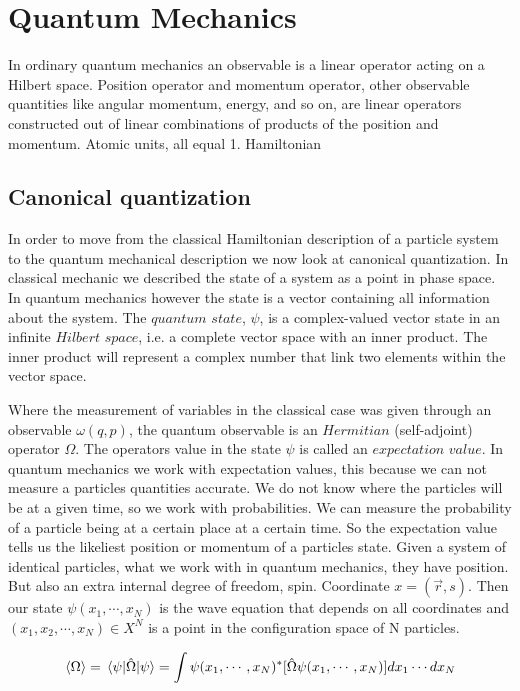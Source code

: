 \section{Quantum Mechanics}

In ordinary quantum mechanics an observable is a linear operator acting on a Hilbert space. Position operator and momentum operator, other observable quantities like angular momentum, energy, and so on, are linear operators constructed out of linear combinations of products of the position and momentum.\cite{kvaal}
Atomic units, all equal 1.
Hamiltonian 

\subsection{Canonical quantization}

In order to move from the classical Hamiltonian description of a particle system to the quantum mechanical description we now look at canonical quantization. 
In classical mechanic we described the state of a system as a point in phase space. In quantum mechanics however the state is a vector containing all information about the system. The $\textit{quantum state}$, $\psi$, is a complex-valued vector state in an infinite $\textit{Hilbert space}$, i.e. a complete vector space with an inner product. The inner product will represent a complex number that link two elements within the vector space. 

Where the measurement of variables in the classical case was given through an observable $\omega(q, p)$, the quantum observable is an $\textit{Hermitian}$ (self-adjoint) operator $\Omega$. The operators value in the state $\psi$ is called an $\textit{expectation value}$.
In quantum mechanics we work with expectation values, this because we can not measure a particles quantities accurate. We do not know where the particles will be at a given time, so we work with probabilities. We can measure the probability of a particle being at a certain place at a certain time. So the expectation value tells us the likeliest position or momentum of a particles state. 
Given a system of identical particles, what we work with in quantum mechanics, they have position. But also an extra internal degree of freedom, spin. Coordinate $x = (\vec{r}, s)$. Then our state $\psi(x_1, \cdots , x_N)$ is the wave equation that depends on all coordinates and $(x_1, x_2, \cdots , x_N) \in X^N$ is a point in the configuration space of N particles. 

\begin{equation}
\expval{\Omega} = \expval{\hat{\Omega}}{\psi} = \int \psi (x_1, \cdots , x_N)^\ast [\hat{\Omega} \psi (x_1, \cdots, x_N)] dx_1 \cdots dx_N
\end{equation}

